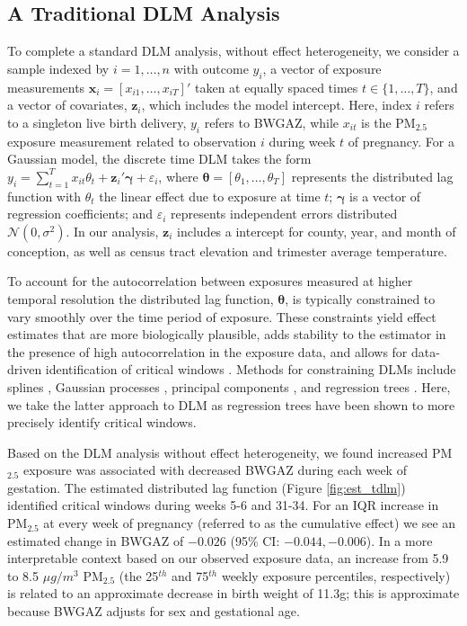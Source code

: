 \documentclass[12pt]{article}
\begin{document}
\subsection{A Traditional DLM Analysis}\label{sec:tdlm_analysis}
To complete a standard DLM analysis, without effect heterogeneity, we consider a sample indexed by $i=1,\ldots,n$ with outcome $y_i$, a vector of exposure measurements $\mathbf{x}_i=[x_{i1},\ldots,x_{iT}]'$ taken at equally spaced times $t\in\{1,\ldots,T\}$, and a vector of covariates, $\mathbf{z}_i$, which includes the model intercept. Here, index $i$ refers to a singleton live birth delivery, $y_i$ refers to BWGAZ, while $x_{it}$ is the PM$_{2.5}$ exposure measurement related to observation $i$ during week $t$ of pregnancy. For a Gaussian model, the discrete time DLM takes the form $y_i=\sum_{t=1}^T x_{it}\theta_t+\mathbf{z}_i'\boldsymbol\gamma+\varepsilon_i$, where $\boldsymbol\theta=[\theta_1,\ldots,\theta_T]$ represents the distributed lag function with $\theta_t$ the linear effect due to exposure at time $t$; $\boldsymbol\gamma$ is a vector of regression coefficients; and $\varepsilon_i$ represents independent errors distributed $\mathcal{N}(0,\sigma^2)$. In our analysis, $\mathbf{z}_i$ includes a intercept for county, year, and month of conception, as well as census tract elevation and trimester average temperature. %

To account for the autocorrelation between exposures measured at higher temporal resolution the distributed lag function, $\boldsymbol\theta$, is typically constrained to vary smoothly over the time period of exposure. These constraints yield effect estimates that are more biologically plausible, adds stability to the estimator in the presence of high autocorrelation in the exposure data, and allows for data-driven identification of critical windows \citep{Wilson2017PotentialHealth}. Methods for constraining DLMs include splines \citep{Zanobetti2000}, Gaussian processes \citep{Warren2020}, principal components \citep{Wilson2017a}, and regression trees \citep{Mork2022EstimatingPairs}. Here, we take the latter approach to DLM as regression trees have been shown to more precisely identify critical windows. %

Based on the DLM analysis without effect heterogeneity, we found increased PM$_{2.5}$ exposure was associated with decreased BWGAZ during each week of gestation. The estimated distributed lag function (Figure \ref{fig:est_tdlm}) identified critical windows during weeks 5-6 and 31-34. For an IQR increase in PM$_{2.5}$ at every week of pregnancy (referred to as the cumulative effect) we see an estimated change in BWGAZ of $-0.026$ (95\% CI: $-0.044,-0.006$). In a more interpretable context based on our observed exposure data, an increase from 5.9 to 8.5 $\mu g/m^3$ PM$_{2.5}$ (the 25$^{th}$ and 75$^{th}$ weekly exposure percentiles, respectively) is related to an approximate decrease in birth weight of 11.3g; this is approximate because BWGAZ adjusts for sex and gestational age.
\end{document}
